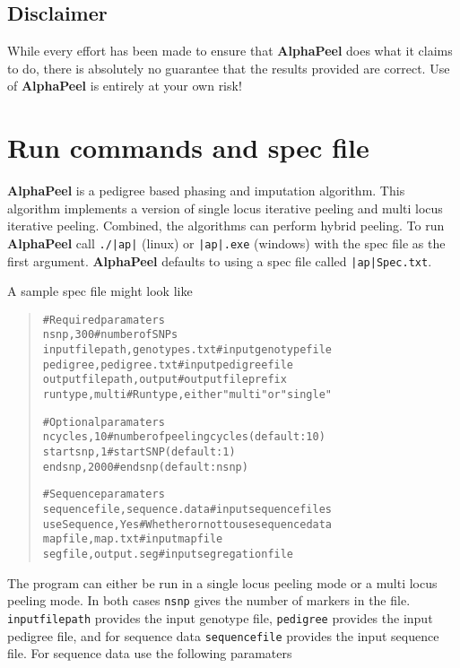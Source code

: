 \documentclass[a4paper]{article}
\begin{document}
\subsection{Disclaimer%
  \label{disclaimer}%
}

While every effort has been made to ensure that \textbf{AlphaPeel} does what it claims to do, there is absolutely no guarantee that the results provided are correct. Use of \textbf{AlphaPeel} is entirely at your own risk!


\section{Run commands and spec file%
  \label{run-commands-and-spec-file}%
}

\textbf{AlphaPeel} is a pedigree based phasing and imputation algorithm. This algorithm implements a version of single locus iterative peeling and multi locus iterative peeling. Combined, the algorithms can perform hybrid peeling. To run \textbf{AlphaPeel} call \texttt{./|ap|} (linux) or \texttt{|ap|.exe} (windows) with the spec file as the first argument. \textbf{AlphaPeel} defaults to using a spec file called \texttt{|ap|Spec.txt}.

A sample spec file might look like

\begin{quote}
\begin{alltt}
#Required paramaters
nsnp, 300                     #number of SNPs
inputfilepath, genotypes.txt  #input genotype file
pedigree, pedigree.txt        #input pedigree file
outputfilepath, output        #output file prefix
runtype, multi                #Run type, either "multi" or "single"

#Optional paramaters
ncycles, 10                   #number of peeling cycles (default:10)
startsnp, 1                   #start SNP (default: 1)
endsnp, 2000                  #end snp (default: nsnp)

#Sequence paramaters
sequencefile, sequence.data   #input sequence files
useSequence, Yes              #Whether or not to use sequence data
mapfile, map.txt              #input map file
segfile, output.seg           #input segregation file
\end{alltt}
\end{quote}

The program can either be run in a single locus peeling mode or a multi locus peeling mode. In both cases \texttt{nsnp} gives the number of markers in the file.  \texttt{inputfilepath} provides the input genotype file, \texttt{pedigree} provides the input pedigree file, and for sequence data \texttt{sequencefile} provides the input sequence file. For sequence data use the following paramaters
\end{document}
